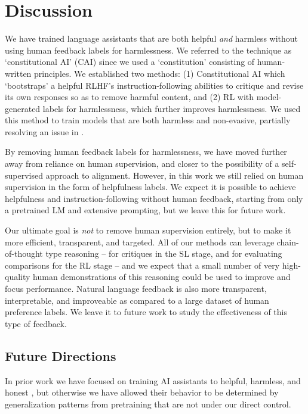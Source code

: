 \section{Discussion}

We have trained language assistants that are both helpful {\it and} harmless without using  human feedback labels for harmlessness. We referred to the technique as `constitutional AI' (CAI) since we used a  `constitution' consisting of  human-written principles.  We established two methods: (1) Constitutional AI which `bootstraps' a helpful RLHF's instruction-following abilities to critique and revise its own responses so as to remove harmful content, and (2) RL with model-generated labels for harmlessness, which further improves harmlessness.  We used this method to train models that are both harmless and non-evasive, partially resolving an issue in \cite{bai2022training}.

By removing human feedback  labels for harmlessness, we have moved further away from reliance on human supervision, and closer to the possibility of a  self-supervised approach to alignment. However, in this work we still relied on human supervision in the form of helpfulness labels.  We expect it is possible to achieve helpfulness and instruction-following without human feedback, starting from only a pretrained LM and extensive prompting, but we leave this  for future work.

Our ultimate goal is \emph{not} to remove human supervision entirely, but to make it more efficient, transparent, and targeted.  All of our methods can leverage chain-of-thought \cite{ScratchPad, ChainOfThought} type reasoning -- for critiques in the SL stage, and for evaluating comparisons for the RL stage -- and we expect that a small number of very high-quality human demonstrations of this reasoning \cite{PerezLanguageFeedback, OAISelfCritique} could be used to improve and focus performance. Natural language  feedback is also more transparent, interpretable, and improveable as compared to a large dataset of human preference labels.  We leave  it to future work to study the effectiveness of this type of feedback.

\subsection{Future Directions}

In prior work we have focused on training AI assistants to helpful, harmless, and honest \cite{askell2021general}, but otherwise we have allowed their behavior to be determined by generalization patterns  from pretraining that are not under our direct control.

